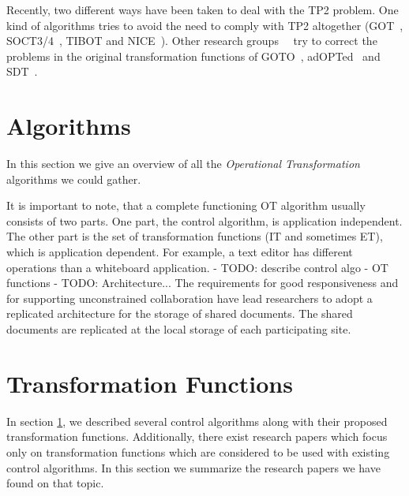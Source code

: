 \documentclass[11pt,a4paper]{article}
\begin{document}
Recently, two different ways have been taken to deal with the TP2 problem. One kind of algorithms tries to avoid the need to comply with TP2 altogether (GOT~\cite{sun98a}, SOCT3/4~\cite{suleiman00}, TIBOT\cite{tibot} and NICE~\cite{sun02}). Other research groups~\cite{li04}~\cite{imine04} try to correct the problems in the original transformation functions of GOTO~\cite{sun98b}, adOPTed~\cite{ressel96} and SDT~\cite{sdt}. 


\section{Algorithms}
\label{algos}
In this section we give an overview of all the \emph{Operational Transformation} algorithms we could gather.

It is important to note, that a complete functioning OT algorithm usually consists of two parts. One part, the control algorithm, is application independent. The other part is the set of transformation functions (IT and sometimes ET), which is application dependent. For example, a text editor has different operations than a whiteboard application.
- TODO: describe control algo - OT functions
- TODO: Architecture...
The requirements for good responsiveness and for supporting unconstrained collaboration have lead researchers to adopt a replicated architecture for the storage of shared documents. The shared documents are replicated at the local storage of each participating site.
















\newpage



\newpage

\section{Transformation Functions}
In section \ref{algos}, we described several control algorithms along with their proposed transformation functions. Additionally, there exist research papers which focus only on transformation functions which are considered to be used with existing control algorithms. In this section we summarize the research papers we have found on that topic.





\newpage



\newpage

\end{document}
